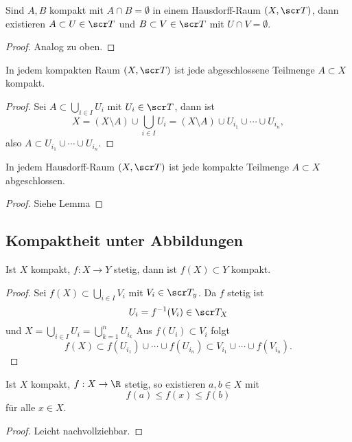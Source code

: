 \begin{st}
	Sind $A, B$ kompakt mit $A \cap B = \emptyset$ in einem Hausdorff-Raum $(X, \scr T)$, dann existieren $A \subset U \in \scr T$ und $B \subset V \in \scr T$ mit $U \cap V = \emptyset$.
	\begin{proof}
		Analog zu oben.
	\end{proof}
\end{st}


\begin{st}
	In jedem kompakten Raum $(X, \scr T)$ ist jede abgeschlossene Teilmenge $A \subset X$ kompakt.
	\begin{proof}
		Sei $A \subset \bigcup_{i\in I} U_i$ mit $U_i \in \scr T$, dann ist
		\[
			X
			= (X \setminus A) \cup \bigcup_{i\in I} U_i
			= (X \setminus A) \cup U_{i_1} \cup \dotsb \cup U_{i_n},
		\]
		also $A \subset U_{i_1} \cup \dotsb \cup U_{i_n}$.
	\end{proof}
\end{st}

\begin{st}
	In jedem Hausdorff-Raum $(X, \scr T)$ ist jede kompakte Teilmenge $A \subset X$ abgeschlossen.
	\begin{proof}
		Siehe Lemma
	\end{proof}
\end{st}

\subsection{Kompaktheit unter Abbildungen}

\begin{st}
	Ist $X$ kompakt, $f: X \to Y$ stetig, dann ist $f(X) \subset Y$ kompakt.
	\begin{proof}
		Sei $f(X) \subset \bigcup_{i\in I} V_i$ mit $V_i \in \scr T_y$.
		Da $f$ stetig ist
		\[
			U_i = f^{-1}(V_i) \in \scr T_X
		\]
		und $X = \bigcup_{i\in I} U_i = \bigcup_{k=1}^n U_{i_k}$
		Aus $f(U_i) \subset V_i$ folgt
		\[
			f(X)
			\subset f(U_{i_1}) \cup \dotsb \cup f(U_{i_n})
			\subset V_{i_1} \cup \dotsb \cup f(V_{i_n}).
		\]
	\end{proof}
\end{st}

\begin{st}
	Ist $X$ kompakt, $f: X \to \R$ stetig, so existieren $a, b \in X$ mit
	\[
		f(a) \le f(x) \le f(b)
	\]
	für alle $x \in X$.
	\begin{proof}
		Leicht nachvollziehbar.
	\end{proof}
\end{st}

